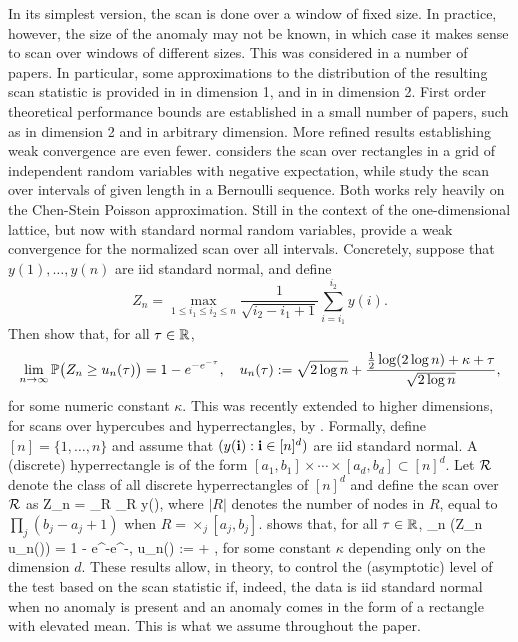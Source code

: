 \documentclass[twoside,11pt]{article}
\begin{document}
In its simplest version, the scan is done over a window of fixed size.  In practice, however, the size of the anomaly may not be known, in which case it makes sense to scan over windows of different sizes.  This was considered in a number of papers.  In particular, some approximations to the distribution of the resulting scan statistic is provided in \citep{naus2004multiple,pozdnyakov2005martingale} in dimension 1, and in \citep{glaz2004multiple,wang2014variable,haiman2006estimation} in dimension 2.
First order theoretical performance bounds are established in a small number of papers, such as \citep{MR2604703,morel} in dimension 2 and \citep{MGD,cluster} in arbitrary dimension.  More refined results establishing weak convergence are even fewer.  \cite{jiang} considers the scan over rectangles in a grid of independent random variables with negative expectation, while \cite{boutsikas} study the scan over intervals of given length in a Bernoulli sequence.  Both works rely heavily on the Chen-Stein Poisson approximation.
Still in the context of the one-dimensional lattice, but now with standard normal random variables, \cite{sieg95} provide 
a weak convergence for the normalized scan over all intervals.  Concretely, suppose that $y(1),\dots,y(n)$ are iid standard normal, and define
\[
Z_n = \max_{1 \le i_1 \le i_2 \le n} \frac1{\sqrt{i_2-i_1+1}} \sum_{i=i_1}^{i_2} y(i).
\]
Then \cite{sieg95} show that, for all $\tau \in \mathbb{R}$, 
\[
\lim_{n \to \infty} \mathbb{P}\big(Z_n \ge u_n(\tau)\big) = 1 - e^{-e^{-\tau}}, \quad u_n(\tau) := \sqrt{2 \log n} + \frac{\frac12 \log(2 \log n) + \kappa + \tau}{ \sqrt{2 \log n}},
\]
for some numeric constant $\kappa$.
This was recently extended to higher dimensions, for scans over hypercubes and hyperrectangles, by \cite{kabluchko2011extremes}.
Formally, define $[n] = \{1, \dots, n\}$ and assume that $(y(\mathbf{i}) : \mathbf{i} \in [n]^d)$ are iid standard normal.  A (discrete) hyperrectangle is of the form $[a_1, b_1] \times \cdots \times [a_d, b_d] \subset [n]^d$.
Let $\mathcal{R}$ denote the class of all discrete hyperrectangles of $[n]^d$ and define the scan over $\mathcal{R}$ as
\beq \label{scan}
Z_n = \max_{R \in \Rcal}  \sum_{\ib \in R} y(\ib),
\eeq
where $|R|$ denotes the number of nodes in $R$, equal to $\prod_j (b_j -a_j +1)$ when $R = \times_j [a_j, b_j]$.
\cite{kabluchko2011extremes} shows that, for all $\tau \in \mathbb{R}$, 
\beq \label{kabluchko}
\lim_{n \to \infty} \PP\big(Z_n \ge u_n(\tau)\big) = 1 - e^{-e^{-\tau}}, \quad u_n(\tau) :=  + ,
\eeq
for some constant $\kappa$ depending only on the dimension $d$.
These results allow, in theory, to control the (asymptotic) level of the test based on the scan statistic if, indeed, the data is iid standard normal when no anomaly is present and an anomaly comes in the form of a rectangle with elevated mean.  This is what we assume throughout the paper. 
\end{document}
